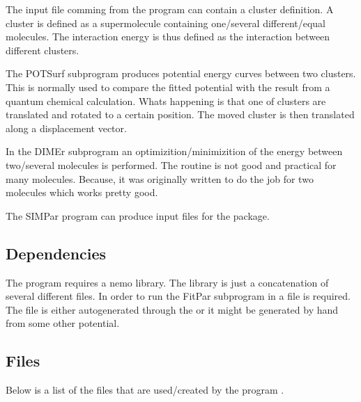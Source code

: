 The input file comming from the  program can contain
a cluster definition. A cluster is defined as a supermolecule containing
one/several different/equal molecules. The interaction energy is thus
defined as the interaction between different clusters.

The POTSurf subprogram produces potential energy curves between two
clusters. This is normally used to compare the fitted potential with the
result from a quantum chemical calculation. Whats happening is that one
of clusters are translated and rotated to a certain position. The moved
cluster is then translated along a displacement vector.

In the DIMEr subprogram an optimizition/minimizition of the energy between
two/several molecules is performed. The routine is not good and practical
for many molecules. Because, it was originally written to do the job for
two molecules which works pretty good.

The SIMPar program can produce input files for the  package.

\subsection{Dependencies}
\label{UG:sec:nemo_dependencies}
The  program requires a nemo library.
The library is just a concatenation of several different  files.
In order to run the FitPar subprogram in  a  file is required.
The  file is either autogenerated through the  or it might be
generated by hand from some other potential.

\subsection{Files}
\label{UG:sec:nemo_files}

Below is a list of the files that are used/created by the program
.

